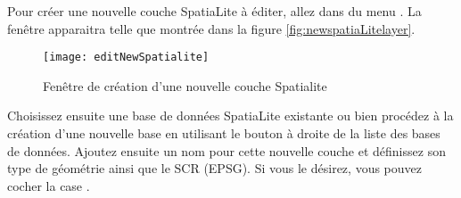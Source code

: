 \label{sec:create spatialite}

Pour créer une nouvelle couche SpatiaLite à éditer, allez dans 
 du menu 
. La fenêtre  apparaitra 
telle que montrée dans la figure \ref{fig:newspatiaLitelayer}.

\begin{figure}[ht]
   \centering
   \texttt{[image: editNewSpatialite]}
   \caption{Fenêtre de création d'une nouvelle couche Spatialite \nixcaption}\label{fig:newspatialitelayer}
\end{figure}


Choisissez ensuite une base de données SpatiaLite existante ou bien procédez à 
la création d'une nouvelle base en utilisant le bouton  à droite de 
la liste des bases de données. Ajoutez ensuite un nom pour cette nouvelle couche 
et définissez son type de géométrie ainsi que le SCR (EPSG). Si vous le désirez,
 vous pouvez cocher la case .


